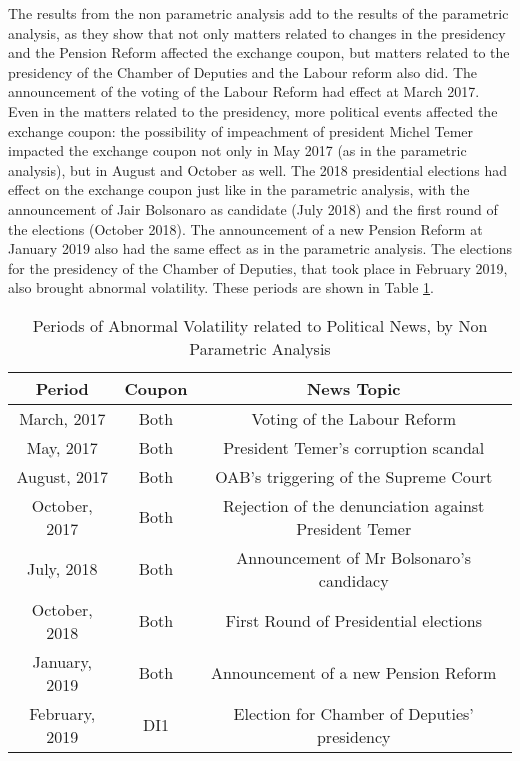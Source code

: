 \documentclass[cic,tc, english]{iiufrgs}
\begin{document}
    The results from the non parametric analysis add to the results of the parametric analysis, as they show that not only matters related to changes in the presidency and the Pension Reform affected the exchange coupon, but matters related to the presidency of the Chamber of Deputies and the Labour reform also did. The announcement of the voting of the Labour Reform had effect at March 2017. Even in the matters related to the presidency, more political events affected the exchange coupon: the possibility of impeachment of president Michel Temer impacted the exchange coupon not only in May 2017 (as in the parametric analysis), but in August and October as well. The 2018 presidential elections had effect on the exchange coupon just like in the parametric analysis, with the announcement of Jair Bolsonaro as candidate (July 2018) and the first round of the elections (October 2018). The announcement of a new Pension Reform at January 2019 also had the same effect as in the parametric analysis. The elections for the presidency of the Chamber of Deputies, that took place in February 2019, also brought abnormal volatility. These periods are shown in Table \ref{tab:resnon}.

    \begin{table}[H]
        \caption{Periods of Abnormal Volatility related to Political News, by Non Parametric Analysis}
        \label{tab:resnon}
        \centering
        \begin{tabular}{ | c | c | c | }
            \hline
            Period & Coupon & News Topic \\
            \hline \hline
            March, 2017 & Both & Voting of the Labour Reform \\
            \hline
            May, 2017 & Both & President Temer's corruption scandal \\
            \hline
            August, 2017 & Both & OAB's triggering of the Supreme Court \\
            \hline
            October, 2017 & Both & Rejection of the denunciation against President Temer \\
            \hline
            July, 2018 & Both & Announcement of Mr Bolsonaro's candidacy \\
            \hline
            October, 2018 & Both & First Round of Presidential elections \\
            \hline
            January, 2019 & Both & Announcement of a new Pension Reform \\
            \hline
            February, 2019 & DI1 & Election for Chamber of Deputies' presidency \\
            \hline
        \end{tabular}
    \end{table}
\end{document}
